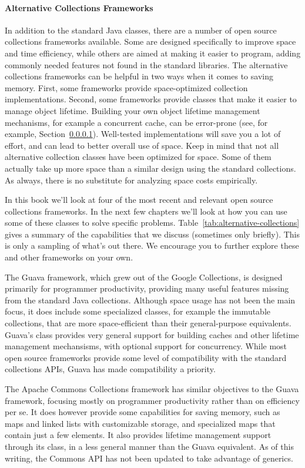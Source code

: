 \paragraph{Alternative Collections Frameworks} In addition to the standard Java
classes, there are a number of open source collections frameworks available. Some are designed
specifically to improve space and time efficiency, while others are aimed at
making it easier to program, adding commonly needed features not
found in the standard libraries. 
The alternative collections frameworks can be helpful in two ways when it comes to saving memory. First,
some frameworks provide space-optimized collection implementations. Second, some frameworks
provide classes that make it easier to manage object lifetime. Building your
own object lifetime management mechanisms, for example a concurrent cache, can
be error-prone (see, for example, Section~\ref{}). Well-tested implementations
will save you a lot of effort, and can lead to better overall use of space.
Keep in mind that not all alternative collection classes have
been optimized for space.
Some of them actually take up more space than a similar design using the
standard collections. As always, there is no substitute for analyzing space costs empirically.


In this book we'll look at four of the most recent and relevant
open source collections frameworks. In the next few chapters we'll look at how
you can use some of these classes to solve specific problems.
Table~\ref{tab:alternative-collections} gives a summary of the capabilities that
we discuss (sometimes only briefly). This is only a sampling of what's out
there. We encourage you to further explore these and other frameworks on your own.

The Guava framework, which grew out of the Google Collections, is
designed primarily for programmer productivity, providing many useful
features missing from the standard Java collections. 
Although space usage has not been the main focus, it does include some
specialized classes, for example the immutable collections, that are more
space-efficient than their general-purpose equivalents. Guava's 
class provides very general support for 
building caches and other lifetime management mechansisms, with optional support
for concurrency. While most open source frameworks provide some level of compatibility with the
standard collections APIs, Guava has made compatibility a priority.

The Apache Commons Collections framework has similar objectives to the Guava
framework, focusing mostly on programmer productivity rather than on
efficiency per se. 
It does however provide some capabilities for saving memory, such as
maps and linked lists with customizable storage, and specialized 
maps that contain just a few elements. It also provides lifetime management
support through its  class, in a less general
manner than the Guava equivalent. As of this writing,
the Commons API has not been updated to take advantage of generics.

